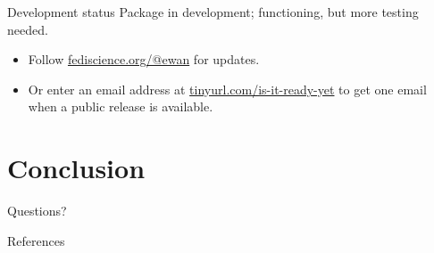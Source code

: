 \documentclass[11pt]{beamer}
\begin{document}
\begin{frame}[t]{Development status}
	Package in development; functioning, but more testing needed.

	\begin{itemize}
		\item Follow
		      \href{https://fediscience.org/@ewan}{\textcolor{KCLseablue}{fediscience.org/@ewan}}
		      for updates.
		\item Or enter an email address at
		      \href{https://tinyurl.com/pmsims-announce}{\textcolor{KCLblue}{tinyurl.com/is-it-ready-yet}}
		      to get one email when a public release is available.
	\end{itemize}

\end{frame}




\section{Conclusion}

\begin{frame}
  Questions?
\end{frame}

\appendix

\begin{frame}[allowframebreaks]{References}
    \printbibliography
\end{frame}
\end{document}
